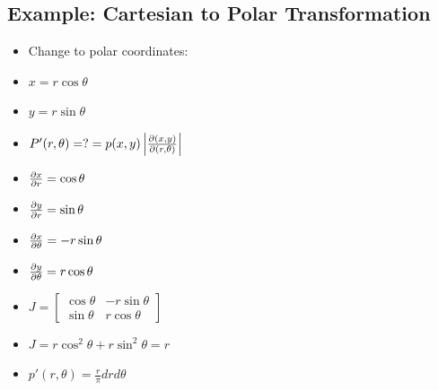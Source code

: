 \subsection{Example: Cartesian to Polar Transformation}
\begin{itemize}
      \item Change to polar coordinates:
      \item $x = r \cos{\theta}$
      \item $y = r \sin{\theta}$
      \item $P'(r, \theta) = ? = p(x,y) \left| \pdv{(x,y)}{(r,\theta)} \right|$

      \item $ \pdv{x}{r} = \cos{\theta}$
      \item $ \pdv{y}{r} = \sin{\theta}$
      \item $ \pdv{x}{\theta} = -r \sin{\theta}$
      \item $ \pdv{y}{\theta} = r \cos{\theta}$

      \item $J = \begin{bmatrix}
                        \cos{\theta} & -r \sin{\theta} \\
                        \sin{\theta} & r \cos{\theta}
                  \end{bmatrix}$

      \item $ J = r \cos^2{\theta} + r \sin^2{\theta} = r$
      \item $p'(r, \theta) = \frac{r}{\pi} dr d\theta$
\end{itemize}
